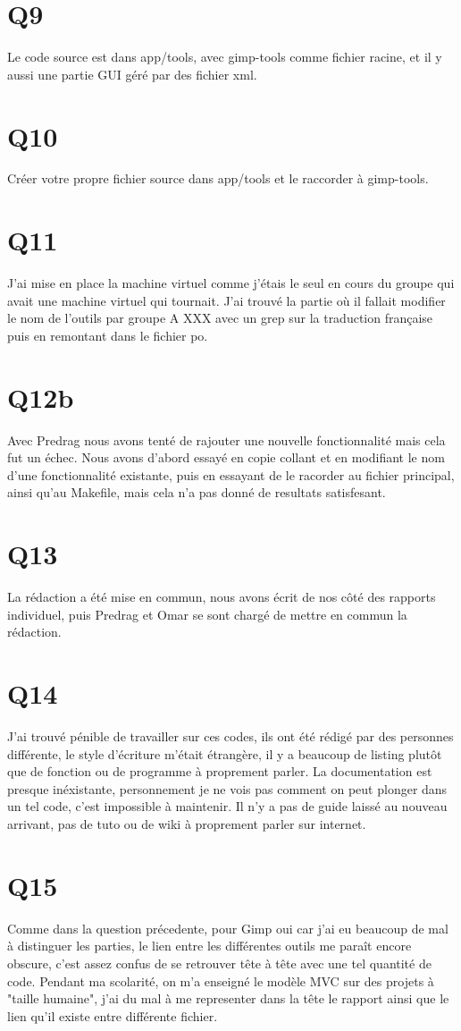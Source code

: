 \documentclass[12pt, letterpaper]{article}
\begin{document}
\section{Q9}
Le code source est dans app/tools, avec gimp-tools comme fichier racine, et il y aussi une partie GUI géré par des fichier xml.

\section{Q10}
Créer votre propre fichier source dans app/tools et le raccorder à gimp-tools.

\section{Q11}
J'ai mise en place la machine virtuel comme j'étais le seul en cours du groupe qui avait une machine virtuel qui tournait. J'ai trouvé la partie où il fallait modifier le nom de l'outils par groupe A XXX avec un grep sur la traduction française puis en remontant dans le fichier po.

\section{Q12b}
Avec Predrag nous avons tenté de rajouter une nouvelle fonctionnalité mais cela fut un échec. Nous avons d'abord essayé en copie collant et en modifiant le nom d'une fonctionnalité existante, puis en essayant de le racorder au fichier principal, ainsi qu'au Makefile,
 mais cela n'a pas donné de resultats satisfesant.

\section{Q13}
La rédaction a été mise en commun, nous avons écrit de nos côté des rapports individuel, puis Predrag et Omar se sont chargé de mettre en commun la rédaction.

\section{Q14}
J'ai trouvé pénible de travailler sur ces codes, ils ont été rédigé par des personnes différente, le style d'écriture m'était étrangère, il y a beaucoup de listing plutôt que de fonction ou de programme à proprement parler. 
La documentation est presque inéxistante, personnement je ne vois pas comment on peut plonger dans un tel code, c'est impossible à maintenir. Il n'y a pas de guide laissé au nouveau arrivant, pas de tuto ou de wiki à proprement parler sur internet.

\section{Q15}
Comme dans la question précedente, pour Gimp oui car j'ai eu beaucoup de mal à distinguer les parties, le lien entre les différentes outils me paraît encore obscure, c'est assez confus de se retrouver tête à tête avec une tel quantité de code. 
Pendant ma scolarité, on m'a enseigné le modèle MVC sur des projets à "taille humaine", j'ai du mal à me representer dans la tête le rapport ainsi que le lien qu'il existe entre différente fichier.
 
\end{document}
